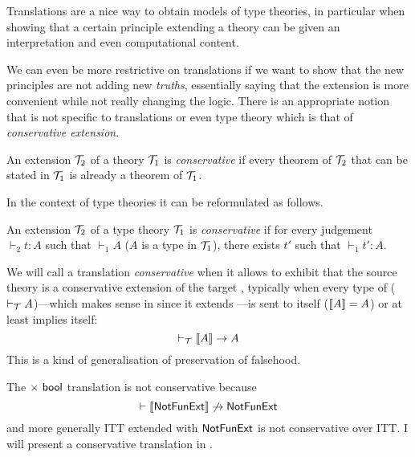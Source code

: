 Translations are a nice way to obtain models of type theories, in particular
when showing that a certain principle extending a theory can be given an
interpretation and even computational content.

We can even be more restrictive on translations if we want to show that the new
principles are not adding new \emph{truths}, essentially saying that the
extension is more convenient while not really changing the logic.
There is an appropriate notion that is not specific to translations or even
type theory which is that of \emph{conservative extension}.

\begin{definition}
  An extension \(\mathcal{T}_2\) of a theory \(\mathcal{T}_1\) is \emph{conservative} if every
  theorem of \(\mathcal{T}_2\) that can be stated in \(\mathcal{T}_1\) is already a theorem of
  \(\mathcal{T}_1\).
\end{definition}

In the context of type theories it can be reformulated as follows.

\begin{definition}
  An extension \(\mathcal{T}_2\) of a type theory \(\mathcal{T}_1\) is \emph{conservative} if
  for every judgement \(\vdash_2 t : A\) such that \(\vdash_1 A\)
  (\ie \(A\) is a type in \(\mathcal{T}_1\)), there exists \(t'\) such that
  \(\vdash_1 t' : A\).
\end{definition}

We will call a translation \emph{conservative} when it allows to exhibit that
the source theory \cS is a conservative extension of the target \cT, typically
when every type of \cT (\ie \(\vdash_\mathcal{T} A\))---which makes sense in \cS since
it extends \cT---is sent to itself (\(\llbracket A \rrbracket = A\)) or at least implies
itself:
\[
  \vdash_\mathcal{T} \llbracket A \rrbracket \to A
\]
This is a kind of generalisation of preservation of falsehood.

The \(\times\ \mathsf{bool}\) translation is not conservative because
\[
  \vdash \llbracket \mathsf{NotFunExt} \rrbracket \not\to \mathsf{NotFunExt}
\]
and more generally \acrshort{ITT} extended with \(\mathsf{NotFunExt}\) is not
conservative over \acrshort{ITT}.
I will present a conservative translation in .

